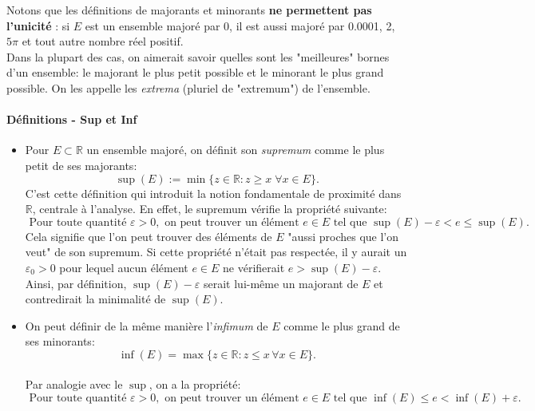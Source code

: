 \documentclass[oneside,11pt,french,table]{book}
\theoremstyle{definition}
\theoremstyle{plain}
\theoremstyle{remark}
\begin{document}
Notons que les définitions de majorants et minorants \textbf{ne permettent pas l'unicité} : si $E$ est un ensemble majoré par 0, il est aussi majoré par 0.0001, 2, $5 \pi$ et tout autre nombre réel positif. \\
Dans la plupart des cas, on aimerait savoir quelles sont les "meilleures" bornes d'un ensemble: le majorant le plus petit possible et le minorant le plus grand possible. On les appelle les \textit{extrema} (pluriel de "extremum") de l'ensemble. \\
\paragraph{Définitions - Sup et Inf}
\begin{itemize}
    \item 
Pour $E \subset \mathbb{R}$ un ensemble majoré, on définit son \textit{supremum} comme le plus petit de ses majorants: $$\sup(E) := \min \{ z \in \mathbb{R} : z \geq x \; \forall x \in E \}.$$ 
C'est cette définition qui introduit la notion fondamentale de proximité dans $\mathbb{R}$, centrale à l'analyse. En effet, le supremum vérifie la propriété suivante:
$$\text{ Pour toute quantité } \varepsilon > 0, \text{ on peut trouver un élément } e \in E \text{ tel que } \sup(E) - \varepsilon < e \leq \sup(E).$$
Cela signifie que l'on peut trouver des éléments de $E$ "aussi proches que l'on veut" de son supremum. Si cette propriété n'était pas respectée, il y aurait un $\varepsilon_0 > 0$ pour lequel aucun élément $e \in E$ ne vérifierait $e > \sup(E) - \varepsilon$. Ainsi, par définition, $\sup(E) - \varepsilon$ serait lui-même un majorant de $E$ et contredirait la minimalité de $\sup(E)$. \\
\item
On peut définir de la même manière l'\textit{infimum} de $E$ comme le plus grand de ses minorants: $$\inf(E) = \max \{ z \in \mathbb{R} : z \leq x \, \forall x \in E \}.$$ \\
Par analogie avec le $\sup$, on a la propriété:
$$\text{ Pour toute quantité } \varepsilon > 0, \text{ on peut trouver un élément } e \in E \text{ tel que } \inf(E) \leq e < \inf(E) + \varepsilon.$$
\end{itemize}
\end{document}
